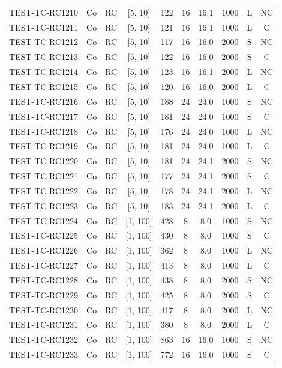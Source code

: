 \begin{longtable}{lccccccccc}
TEST-TC-RC1210 & Co & RC & [5, 10] & 122 & 16 & 16.1 & 1000 & L & NC \\
TEST-TC-RC1211 & Co & RC & [5, 10] & 121 & 16 & 16.1 & 1000 & L & C \\
TEST-TC-RC1212 & Co & RC & [5, 10] & 117 & 16 & 16.0 & 2000 & S & NC \\
TEST-TC-RC1213 & Co & RC & [5, 10] & 122 & 16 & 16.0 & 2000 & S & C \\
TEST-TC-RC1214 & Co & RC & [5, 10] & 123 & 16 & 16.1 & 2000 & L & NC \\
TEST-TC-RC1215 & Co & RC & [5, 10] & 120 & 16 & 16.0 & 2000 & L & C \\
TEST-TC-RC1216 & Co & RC & [5, 10] & 188 & 24 & 24.0 & 1000 & S & NC \\
TEST-TC-RC1217 & Co & RC & [5, 10] & 181 & 24 & 24.0 & 1000 & S & C \\
TEST-TC-RC1218 & Co & RC & [5, 10] & 176 & 24 & 24.0 & 1000 & L & NC \\
TEST-TC-RC1219 & Co & RC & [5, 10] & 181 & 24 & 24.0 & 1000 & L & C \\
TEST-TC-RC1220 & Co & RC & [5, 10] & 181 & 24 & 24.1 & 2000 & S & NC \\
TEST-TC-RC1221 & Co & RC & [5, 10] & 177 & 24 & 24.1 & 2000 & S & C \\
TEST-TC-RC1222 & Co & RC & [5, 10] & 178 & 24 & 24.1 & 2000 & L & NC \\
TEST-TC-RC1223 & Co & RC & [5, 10] & 183 & 24 & 24.1 & 2000 & L & C \\
TEST-TC-RC1224 & Co & RC & [1, 100] & 428 & 8 & 8.0 & 1000 & S & NC \\
TEST-TC-RC1225 & Co & RC & [1, 100] & 430 & 8 & 8.0 & 1000 & S & C \\
TEST-TC-RC1226 & Co & RC & [1, 100] & 362 & 8 & 8.0 & 1000 & L & NC \\
TEST-TC-RC1227 & Co & RC & [1, 100] & 413 & 8 & 8.0 & 1000 & L & C \\
TEST-TC-RC1228 & Co & RC & [1, 100] & 438 & 8 & 8.0 & 2000 & S & NC \\
TEST-TC-RC1229 & Co & RC & [1, 100] & 425 & 8 & 8.0 & 2000 & S & C \\
TEST-TC-RC1230 & Co & RC & [1, 100] & 417 & 8 & 8.0 & 2000 & L & NC \\
TEST-TC-RC1231 & Co & RC & [1, 100] & 380 & 8 & 8.0 & 2000 & L & C \\
TEST-TC-RC1232 & Co & RC & [1, 100] & 863 & 16 & 16.0 & 1000 & S & NC \\
TEST-TC-RC1233 & Co & RC & [1, 100] & 772 & 16 & 16.0 & 1000 & S & C \\

\end{longtable}
